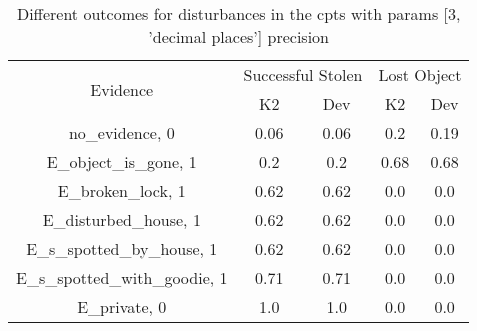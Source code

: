 \begin{table}\begin{tabular}{c|cc|cc}\toprule\multirow{2}{*}{Evidence} & \multicolumn{2}{c}{Successful Stolen} & \multicolumn{2}{c}{Lost Object} \\& {K2} & {Dev} & {K2} & {Dev} \\\midrule
no\_evidence, 0 & 0.06&0.06&\cellcolor{Bittersweet}0.2&\cellcolor{Bittersweet}0.19\\E\_object\_is\_gone, 1 & 0.2&0.2&0.68&0.68\\E\_broken\_lock, 1 & 0.62&0.62&0.0&0.0\\E\_disturbed\_house, 1 & 0.62&0.62&0.0&0.0\\E\_s\_spotted\_by\_house, 1 & 0.62&0.62&0.0&0.0\\E\_s\_spotted\_with\_goodie, 1 & 0.71&0.71&0.0&0.0\\E\_private, 0 & 1.0&1.0&0.0&0.0\\\bottomrule\end{tabular}\caption{Different outcomes for disturbances in the cpts with params [3, 'decimal places'] precision}\end{table}